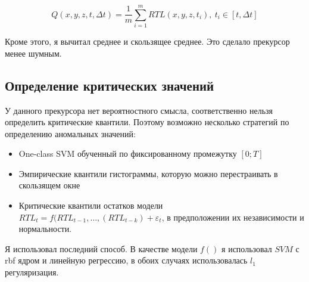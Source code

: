 $$Q(x,y,z,t,\Delta t) = \dfrac{1}{m}\sum_{i=1}^{m}RTL(x,y,z,t_i),~t_i\in[t,\Delta t]$$ 

Кроме этого, я вычитал среднее и скользящее среднее. Это сделало прекурсор менее шумным.

\subsection{Определение критических значений}
У данного прекурсора нет вероятностного смысла, соответственно нельзя определить критические квантили. 
Поэтому возможно несколько стратегий по определению аномальных значений:
\begin{itemize}
\item One-class SVM обученный по фиксированному промежутку $[0;T]$
\item Эмпирические квантили гистограммы, которую можно перестраивать в скользящем окне
\item Критические квантили остатков модели $RTL_{t} = f(RTL_{t-1},\dots, (RTL_{t-k}) + \varepsilon_t$, в предположении их независимости и нормальности. 
\end{itemize}

Я использовал последний способ. В качестве модели $f()$ я использовал $SVM$ с rbf ядром и линейную регрессию, в обоих случаях использовалась $l_1$ регуляризация. 

